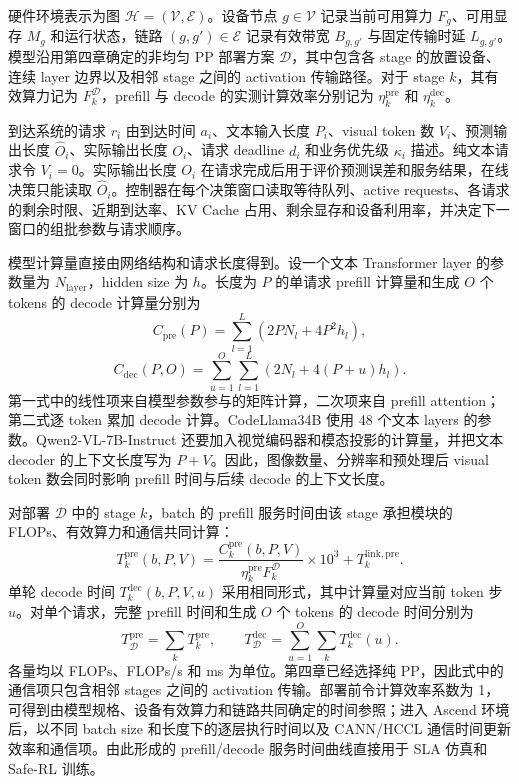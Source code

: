 硬件环境表示为图 \(\mathcal H=(\mathcal V,\mathcal E)\)。设备节点 \(g\in\mathcal V\) 记录当前可用算力 \(F_g\)、可用显存 \(M_g\) 和运行状态，链路 \((g,g')\in\mathcal E\) 记录有效带宽 \(B_{g,g'}\) 与固定传输时延 \(L_{g,g'}\)。模型沿用第四章确定的非均匀 PP 部署方案 \(\mathcal D\)，其中包含各 stage 的放置设备、连续 layer 边界以及相邻 stage 之间的 activation 传输路径。对于 stage \(k\)，其有效算力记为 \(F_k^{\mathcal D}\)，prefill 与 decode 的实测计算效率分别记为 \(\eta_{k}^{\mathrm{pre}}\) 和 \(\eta_{k}^{\mathrm{dec}}\)。

到达系统的请求 \(r_i\) 由到达时间 \(a_i\)、文本输入长度 \(P_i\)、visual token 数 \(V_i\)、预测输出长度 \(\widehat O_i\)、实际输出长度 \(O_i\)、请求 deadline \(d_i\) 和业务优先级 \(\kappa_i\) 描述。纯文本请求令 \(V_i=0\)。实际输出长度 \(O_i\) 在请求完成后用于评价预测误差和服务结果，在线决策只能读取 \(\widehat O_i\)。控制器在每个决策窗口读取等待队列、active requests、各请求的剩余时限、近期到达率、KV Cache 占用、剩余显存和设备利用率，并决定下一窗口的组批参数与请求顺序。

模型计算量直接由网络结构和请求长度得到。设一个文本 Transformer layer 的参数量为 \(N_{\mathrm{layer}}\)，hidden size 为 \(h\)。长度为 \(P\) 的单请求 prefill 计算量和生成 \(O\) 个 tokens 的 decode 计算量分别为
\[
C_{\mathrm{pre}}(P)=
\sum_{l=1}^{L}\left(2PN_l+4P^2h_l\right),
\]
\[
C_{\mathrm{dec}}(P,O)=
\sum_{u=1}^{O}\sum_{l=1}^{L}
\left(2N_l+4(P+u)h_l\right).
\]
第一式中的线性项来自模型参数参与的矩阵计算，二次项来自 prefill attention；第二式逐 token 累加 decode 计算。CodeLlama34B 使用 48 个文本 layers 的参数。Qwen2-VL-7B-Instruct 还要加入视觉编码器和模态投影的计算量，并把文本 decoder 的上下文长度写为 \(P+V\)。因此，图像数量、分辨率和预处理后 visual token 数会同时影响 prefill 时间与后续 decode 的上下文长度。

对部署 \(\mathcal D\) 中的 stage \(k\)，batch 的 prefill 服务时间由该 stage 承担模块的 FLOPs、有效算力和通信共同计算：
\[
T_{k}^{\mathrm{pre}}(b,P,V)=
\frac{C_{k}^{\mathrm{pre}}(b,P,V)}
{\eta_{k}^{\mathrm{pre}}F_k^{\mathcal D}}\times10^3
+T_{k}^{\mathrm{link,pre}}.
\]
单轮 decode 时间 \(T_{k}^{\mathrm{dec}}(b,P,V,u)\) 采用相同形式，其中计算量对应当前 token 步 \(u\)。对单个请求，完整 prefill 时间和生成 \(O\) 个 tokens 的 decode 时间分别为
\[
T_{\mathcal D}^{\mathrm{pre}}=\sum_k T_k^{\mathrm{pre}},
\qquad
T_{\mathcal D}^{\mathrm{dec}}=\sum_{u=1}^{O}\sum_k T_k^{\mathrm{dec}}(u).
\]
各量均以 FLOPs、FLOPs/s 和 ms 为单位。第四章已经选择纯 PP，因此式中的通信项只包含相邻 stages 之间的 activation 传输。部署前令计算效率系数为 1，可得到由模型规格、设备有效算力和链路共同确定的时间参照；进入 Ascend 环境后，以不同 batch size 和长度下的逐层执行时间以及 CANN/HCCL 通信时间更新效率和通信项。由此形成的 prefill/decode 服务时间曲线直接用于 SLA 仿真和 Safe-RL 训练。

